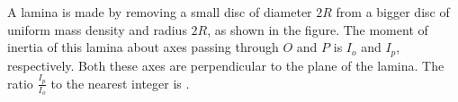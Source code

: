 
\item A lamina is made by removing a small disc of diameter \( 2R \) from a bigger disc of uniform mass density and radius \( 2R \), as shown in the figure. The moment of inertia of this lamina about axes passing through \( O \) and \( P \) is \( I_{o} \) and \( I_{p} \), respectively. Both these axes are perpendicular to the plane of the lamina. The ratio \( \frac{I_{p}}{I_{o}} \) to the nearest integer is \underline{\hspace{2.5cm}}.

\begin{center}
\end{center}

